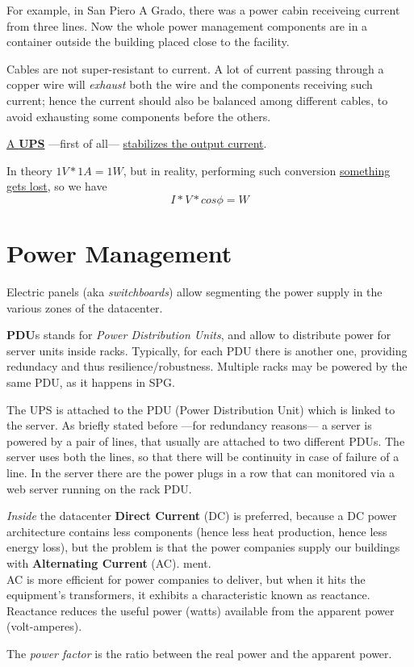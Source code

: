 For example, in San Piero A Grado, there was a power cabin receiveing current from three lines.
Now the whole power management components are in a container outside the building placed close to the facility.

Cables are not super-resistant to current. A lot of current passing through a copper wire will \textit{exhaust} both the wire and the components receiving such current;
hence the current should also be balanced among different cables, to avoid exhausting some components before the others.


\ul{A \textbf{UPS}} ---first of all--- \ul{stabilizes the output current}.

In theory $1V * 1A = 1W$, but in reality, performing such conversion \ul{something gets lost}, so we have
\[I * V * cos \phi = W\]

\section{Power Management}

Electric panels (aka \textit{switchboards}) allow segmenting the power supply in the various zones of the datacenter.

\textbf{PDU}s stands for \textit{Power Distribution Units}, and allow to distribute power for server units inside racks.
Typically, for each PDU there is another one, providing redundacy and thus resilience/robustness.
Multiple racks may be powered by the same PDU, as it happens in SPG.

The UPS is attached to the PDU (Power Distribution Unit) which is linked to the server.
As briefly stated before ---for redundancy reasons--- a server is powered by a pair of lines, that usually are attached to two different PDUs. The server uses both the lines, so that there will be continuity in case of failure of a line. 
In the server there are the power plugs in a row that can monitored via a web server running on the rack PDU.

\nl

\textit{Inside} the datacenter \textbf{Direct Current} (DC) is preferred, because a DC power architecture contains less components (hence less heat production, hence less energy loss), but the problem is that the power companies supply our buildings with \textbf{Alternating Current} (AC).
ment.\\
AC is more efficient for power companies to deliver, but when it hits the equipment’s transformers, it exhibits a characteristic known as reactance.
Reactance reduces the useful power (watts) available from the apparent power (volt-amperes).
\begin{definition}
The \textit{power factor} is the ratio between the real power and the apparent power.
\end{definition}

